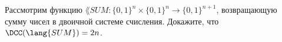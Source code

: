 Рассмотрим функцию $\lang{SUM}\colon \{0, 1\}^n \times \{0, 1\}^n \to \{0, 1\}^{n + 1}$, возвращающую
сумму чисел в двоичной системе счисления. Докажите, что $\DCC(\lang{SUM}) = 2n$.